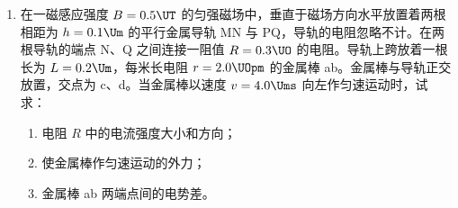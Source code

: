 \documentclass[\gkver]{gaokaozhenti}
\begin{document}
\begin{enumerate}
{\onepicture[h=3.17cm]{}

（说明：各力方向必须大致正确，力的大小比例不作要求）

（2）$f=\mu(mg\cos\alpha+F\sin\alpha)$，2 分。

（3）$F\cos\alpha-f-mg\sin\alpha=ma$，3 分。

$a=2.3\Umsq$，方向沿斜面向上（或在图上标出），方向、数值、单位各给 1 分。
}

\item
在一磁感应强度 $B=0.5\UT$ 的匀强磁场中，垂直于磁场方向水平放置着两根相距为 $h=0.1\Um$ 的平行金属导轨 MN 与 PQ，导轨的电阻忽略不计。在两根导轨的端点 N、Q 之间连接一阻值 $R=0.3\UO$ 的电阻。导轨上跨放着一根长为 $L=0.2\Um$，每米长电阻 $r=2.0\UOpm$ 的金属棒 ab。金属棒与导轨正交放置，交点为 c、d。当金属棒以速度 $v=4.0\Ums$ 向左作匀速运动时，试求：
\begin{enumerate}
	\item
	电阻 $R$ 中的电流强度大小和方向；
	\item
	使金属棒作匀速运动的外力；
	\item
	金属棒 ab 两端点间的电势差。
\end{enumerate}
\onepicture[align=right, w=7.16cm]{}



\end{enumerate}
\end{document}
